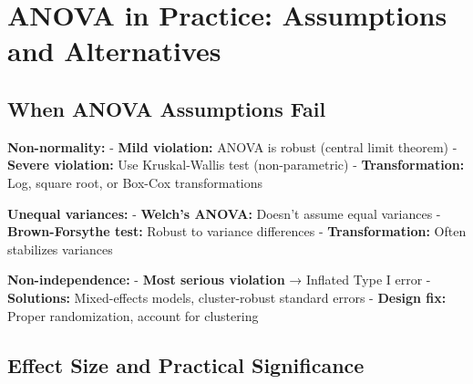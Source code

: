 \documentclass[
  11pt,
  letterpaper,
  oneside]{book}
\begin{document}
\section{ANOVA in Practice: Assumptions and
Alternatives}\label{anova-in-practice-assumptions-and-alternatives}

\subsection{When ANOVA Assumptions
Fail}\label{when-anova-assumptions-fail}

\begin{tcolorbox}[enhanced jigsaw, toprule=.15mm, left=2mm, opacitybacktitle=0.6, colframe=quarto-callout-warning-color-frame, leftrule=.75mm, titlerule=0mm, coltitle=black, colbacktitle=quarto-callout-warning-color!10!white, toptitle=1mm, title=\textcolor{quarto-callout-warning-color}{\faExclamationTriangle}\hspace{0.5em}{Assumption Violations and Solutions}, bottomtitle=1mm, arc=.35mm, rightrule=.15mm, bottomrule=.15mm, breakable, opacityback=0, colback=white]

\textbf{Non-normality:} - \textbf{Mild violation:} ANOVA is robust
(central limit theorem) - \textbf{Severe violation:} Use Kruskal-Wallis
test (non-parametric) - \textbf{Transformation:} Log, square root, or
Box-Cox transformations

\textbf{Unequal variances:} - \textbf{Welch's ANOVA:} Doesn't assume
equal variances - \textbf{Brown-Forsythe test:} Robust to variance
differences - \textbf{Transformation:} Often stabilizes variances

\textbf{Non-independence:} - \textbf{Most serious violation} → Inflated
Type I error - \textbf{Solutions:} Mixed-effects models, cluster-robust
standard errors - \textbf{Design fix:} Proper randomization, account for
clustering

\end{tcolorbox}

\subsection{Effect Size and Practical
Significance}\label{effect-size-and-practical-significance}
\end{document}
